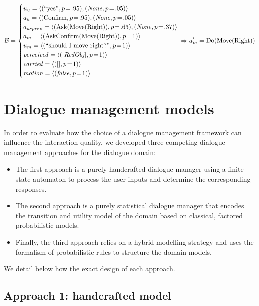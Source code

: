 \begin{align*}
\mathcal{B} = \begin{cases} u_u = \langle (``\text{yes}", p\!=\!.95), (\mathit{None}, p\!=\!.05) \rangle \\
a_u = \langle (\mathrm{Confirm}, p\!=\!.95), (\mathit{None}, p\!=\!.05) \rangle \\
a_{u\mbox{-}prev} = \langle (\mathrm{Ask(Move(Right))}, p\!=\!.63), (\mathit{None}, p\!=\!.37) \rangle \\
a_m = \langle (\mathrm{AskConfirm(Move(Right))}, p\!=\!1) \rangle \\
u_m = \langle (``\text{should I move right?}", p\!=\!1) \rangle \\
\mathit{perceived} = \langle ([\mathit{RedObj}], p\!=\!1) \rangle \\
\mathit{carried} = \langle ([], p\!=\!1) \rangle \\
\mathit{motion} = \langle (\mathit{false}, p\!=\!1) \rangle \\
 \end{cases} \!\!\!\!\!\Rightarrow a_m' = \mathrm{Do(Move(Right))}
\end{align*}


\section{Dialogue management models}
\label{sec:dialmodels_exp3}

In order to evaluate how the choice of a dialogue management framework can influence the interaction quality, we developed three competing dialogue management approaches for the dialogue domain:
\begin{itemize} 
\item The first approach is a purely handcrafted dialogue manager using a finite-state automaton to process the user inputs and determine the corresponding responses. 
\item The second approach is a purely statistical dialogue manager that encodes the transition and utility model of the domain based on classical, factored probabilistic models.
\item Finally, the third approach relies on a hybrid modelling strategy and uses the formalism of probabilistic rules to structure the domain models.
\end{itemize}

We detail below how the exact design of each approach.

\subsection{Approach 1: handcrafted model}


